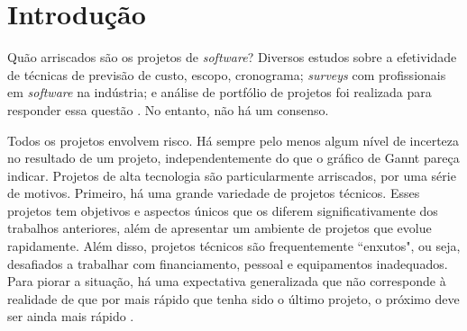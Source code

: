 \chapter{Introdução}\label{cap:introduction}

Quão arriscados são os projetos de \textit{software}? Diversos estudos sobre a efetividade de técnicas de previsão de custo, escopo, cronograma; \textit{surveys} com profissionais em \textit{software} na indústria; e análise de portfólio de projetos foi realizada para responder essa questão \cite{budzier2013double} \cite{flyvbjerg2013quality} \cite{jones1998estimating} \cite{CHAOS2009} \cite{jones2008applied} \cite{molokken2003review}. No entanto, não há um consenso.

Todos os projetos envolvem risco. Há sempre pelo menos algum nível de incerteza no resultado de um projeto, independentemente do que o gráfico de Gannt \cite{maylor2001beyond} pareça indicar. Projetos de alta tecnologia são particularmente arriscados, por uma série de motivos. Primeiro, há uma grande variedade de projetos técnicos. Esses projetos tem objetivos e aspectos únicos que os diferem significativamente dos trabalhos anteriores, além de apresentar um ambiente de projetos que evolue rapidamente. Além disso, projetos técnicos são frequentemente ``enxutos", ou seja, desafiados a trabalhar com financiamento, pessoal e equipamentos inadequados. Para piorar a situação, há uma expectativa generalizada que não corresponde à realidade de que por mais rápido que tenha sido o último projeto, o próximo deve ser ainda mais rápido \cite{kendrick2003identifying}.

